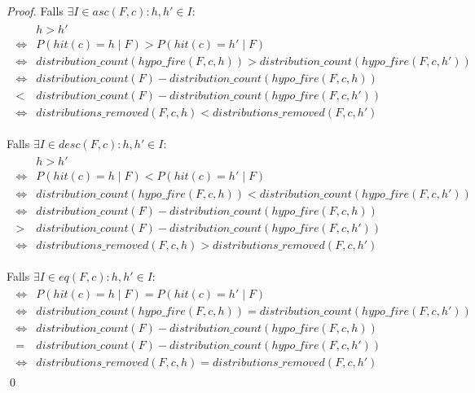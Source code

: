 \documentclass[a4paper,12pt]{llncs}
\numberwithin{equation}{section}
\begin{document}
\begin{proof}

Falls $\exists I \in asc(F, c) \colon h,h' \in I$:
\begin{align}
\begin{split}
&h > h' \\
\Leftrightarrow &P(hit(c)=h \mid F) > P(hit(c)=h' \mid F) \\
\Leftrightarrow &distribution\_count(hypo\_fire(F,c, h)) > distribution\_count(hypo\_fire(F,c, h')) \\
\Leftrightarrow &distribution\_count(F) - distribution\_count(hypo\_fire(F,c, h)) \\
< &distribution\_count(F) - distribution\_count(hypo\_fire(F,c, h')) \\
\Leftrightarrow &distributions\_removed(F,c, h) < distributions\_removed(F,c, h')
\nonumber
\end{split}
\end{align}

Falls $\exists I \in desc(F, c) \colon h,h' \in I$:
\begin{align}
\begin{split}
&h > h' \\
\Leftrightarrow &P(hit(c)=h \mid F) < P(hit(c)=h' \mid F) \\
\Leftrightarrow &distribution\_count(hypo\_fire(F,c, h)) < distribution\_count(hypo\_fire(F,c, h')) \\
\Leftrightarrow &distribution\_count(F) - distribution\_count(hypo\_fire(F,c, h)) \\
> &distribution\_count(F) - distribution\_count(hypo\_fire(F,c, h')) \\
\Leftrightarrow &distributions\_removed(F,c, h) > distributions\_removed(F,c, h')
\nonumber
\end{split}
\end{align}

Falls $\exists I \in eq(F, c) \colon h,h' \in I$:
\begin{align}
\begin{split}
\Leftrightarrow &P(hit(c)=h \mid F) = P(hit(c)=h' \mid F) \\
\Leftrightarrow &distribution\_count(hypo\_fire(F,c, h)) = distribution\_count(hypo\_fire(F,c, h')) \\
\Leftrightarrow &distribution\_count(F) - distribution\_count(hypo\_fire(F,c, h)) \\
= &distribution\_count(F) - distribution\_count(hypo\_fire(F,c, h')) \\
\Leftrightarrow &distributions\_removed(F,c, h) = distributions\_removed(F,c, h')
\nonumber
\end{split}
\end{align}
\qed
\end{proof}
\end{document}
